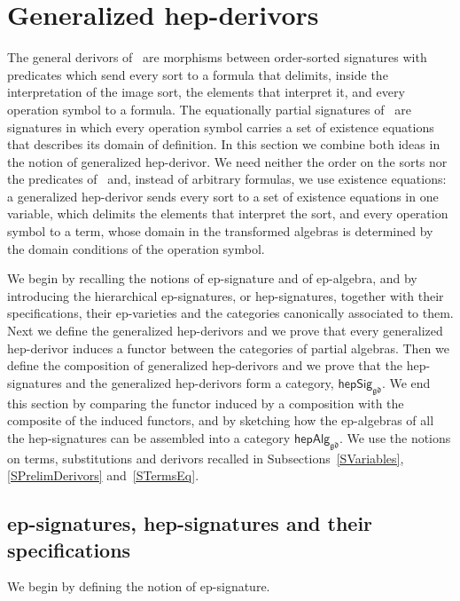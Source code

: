 \documentclass[a4paper, reqno
]{amsart}
\newcommand{\gd}{\mathfrak{gd}}              %
\theoremstyle{plain}
\theoremstyle{definition}
\begin{document}
\section{Generalized hep-derivors}\label{SGenHepDerivors}

The general derivors of~\cite{LG18} are morphisms between order-sorted signatures with predicates which send every sort to a formula that delimits, inside the interpretation of the image sort, the elements that interpret it, and every operation symbol to a formula.
The equationally partial signatures of~\cite{Rei87} are signatures in which every operation symbol carries a set of existence equations that describes its domain of definition.
In this section we combine both ideas in the notion of generalized hep-derivor.
We need neither the order on the sorts nor the predicates of~\cite{LG18} and, instead of arbitrary formulas, we use existence equations: a generalized hep-derivor sends every sort to a set of existence equations in one variable, which delimits the elements that interpret the sort, and every operation symbol to a term, whose domain in the transformed algebras is determined by the domain conditions of the operation symbol.

We begin by recalling the notions of ep-signature and of ep-algebra, and by introducing the hierarchical ep-signatures, or hep-signatures, together with their specifications, their ep-varieties and the categories canonically associated to them.
Next we define the generalized hep-derivors and we prove that every generalized hep-derivor induces a functor between the categories of partial algebras.
Then we define the composition of generalized hep-derivors and we prove that the hep-signatures and the generalized hep-derivors form a category, $\mathsf{hepSig}_{\gd}$.
We end this section by comparing the functor induced by a composition with the composite of the induced functors, and by sketching how the ep-algebras of all the hep-signatures can be assembled into a category $\mathsf{hepAlg}_{\gd}$.
We use the notions on terms, substitutions and derivors recalled in Subsections~\ref{SVariables}, \ref{SPrelimDerivors} and~\ref{STermsEq}.

\subsection{ep-signatures, hep-signatures and their specifications}\label{SEpSignatures}

We begin by defining the notion of ep-signature.
\end{document}
